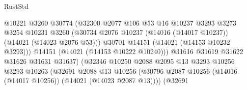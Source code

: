 \begin{lexlean}{RustStd}
\begin{coremodule}
                                            @10221
                                            @3260
                                            @30774
                                            (@32300
                                              @2077
                                              @106
                                              @53
                                              @16
                                              @10237
                                              @3293
                                              @3273
                                              @3254
                                              @10231
                                              @3260
                                              (@30734
                                                @2076
                                                @10237
                                                (@14016 (@14017 @10237))
                                                (@14021 (@14023 @2076 @53)))
                                              @30701
                                              @14151
                                              (@14021 (@14153 @10232 @3293)))
                                            @14151
                                            (@14021 (@14153 @10222 @10240)))
                                          @31616
                                          @31619
                                          @31622
                                          @31626
                                          @31631
                                          @31637)
                                        (@32346
                                          @10250
                                          @2088
                                          @2095
                                          @13
                                          @3293
                                          @10256
                                          @3293
                                          @10263
                                          (@32691
                                            @2088
                                            @13
                                            @10256
                                            (@30796
                                              @2087
                                              @10256
                                              (@14016 (@14017 @10256))
                                              (@14021 (@14023 @2087 @13))))
                                          (@32691

\end{coremodule}
\end{lexlean}
